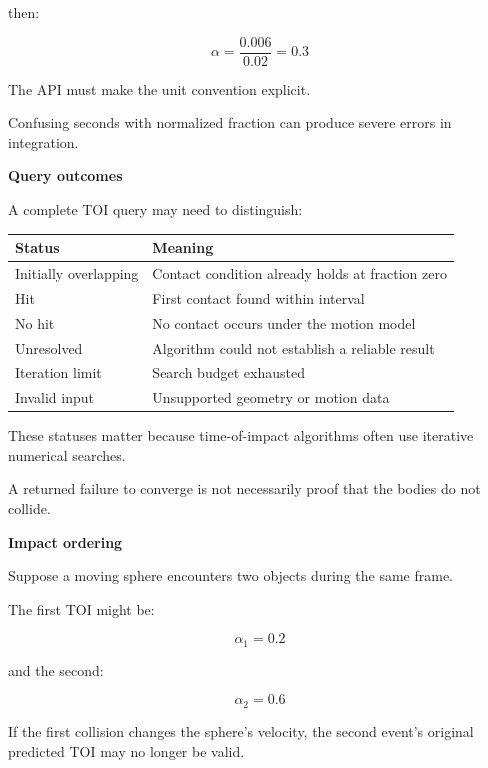 then:

\[
\alpha=\frac{0.006}{0.02}=0.3
\]

The API must make the unit convention explicit.

Confusing seconds with normalized fraction can produce severe errors in integration.

\textbf{Query outcomes}

A complete TOI query may need to distinguish:

{\def\LTcaptype{none} %
\begin{longtable}[]{@{}
  >{\raggedright\arraybackslash}p{}
  >{\raggedright\arraybackslash}p{}@{}}
\toprule\noalign{}
\begin{minipage}[b]{\linewidth}\raggedright
Status
\end{minipage} & \begin{minipage}[b]{\linewidth}\raggedright
Meaning
\end{minipage} \\
\midrule\noalign{}
\endhead
\bottomrule\noalign{}
\endlastfoot
Initially overlapping & Contact condition already holds at fraction zero \\
Hit & First contact found within interval \\
No hit & No contact occurs under the motion model \\
Unresolved & Algorithm could not establish a reliable result \\
Iteration limit & Search budget exhausted \\
Invalid input & Unsupported geometry or motion data \\
\end{longtable}
}

These statuses matter because time-of-impact algorithms often use iterative numerical searches.

A returned failure to converge is not necessarily proof that the bodies do not collide.

\textbf{Impact ordering}

Suppose a moving sphere encounters two objects during the same frame.

The first TOI might be:

\[
\alpha_1=0.2
\]

and the second:

\[
\alpha_2=0.6
\]

If the first collision changes the sphere's velocity, the second event's original predicted TOI may no longer be valid.

